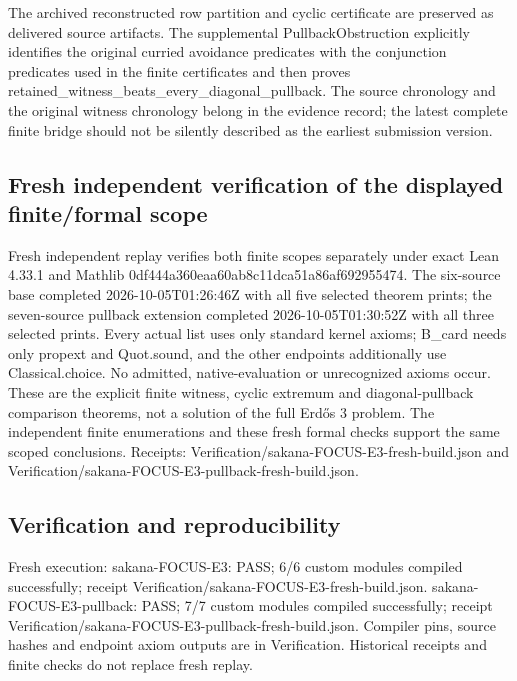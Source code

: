 \documentclass[11pt,a4paper]{article}
\begin{document}
The archived reconstructed row partition and cyclic certificate are preserved as delivered source artifacts. The supplemental PullbackObstruction explicitly identifies the original curried avoidance predicates with the conjunction predicates used in the finite certificates and then proves retained\_witness\_beats\_every\_diagonal\_pullback. The source chronology and the original witness chronology belong in the evidence record; the latest complete finite bridge should not be silently described as the earliest submission version.

\subsection{Fresh independent verification of the displayed finite/formal scope}
Fresh independent replay verifies both finite scopes separately under exact Lean 4.33.1 and Mathlib 0df444a360eaa60ab8c11dca51a86af692955474. The six-source base completed 2026-10-05T01:26:46Z with all five selected theorem prints; the seven-source pullback extension completed 2026-10-05T01:30:52Z with all three selected prints. Every actual list uses only standard kernel axioms; B\_card needs only propext and Quot.sound, and the other endpoints additionally use Classical.choice. No admitted, native-evaluation or unrecognized axioms occur. These are the explicit finite witness, cyclic extremum and diagonal-pullback comparison theorems, not a solution of the full Erdős 3 problem. The independent finite enumerations and these fresh formal checks support the same scoped conclusions. Receipts: Verification/sakana-FOCUS-E3-fresh-build.json and Verification/sakana-FOCUS-E3-pullback-fresh-build.json.

\subsection{Verification and reproducibility}
Fresh execution: sakana-FOCUS-E3: PASS; 6/6 custom modules compiled successfully; receipt Verification/sakana-FOCUS-E3-fresh-build.json. sakana-FOCUS-E3-pullback: PASS; 7/7 custom modules compiled successfully; receipt Verification/sakana-FOCUS-E3-pullback-fresh-build.json. Compiler pins, source hashes and endpoint axiom outputs are in Verification. Historical receipts and finite checks do not replace fresh replay.
\end{document}
